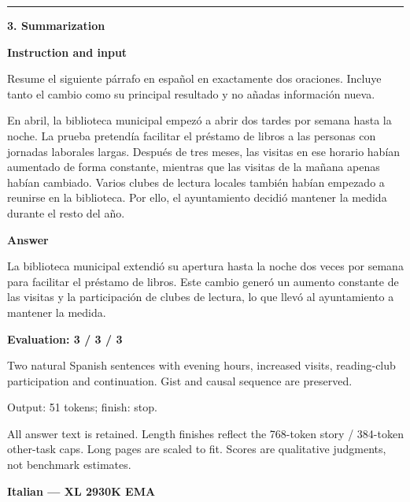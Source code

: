 \documentclass[10pt]{article}
\begin{document}
{\begin{minipage}{\textwidth}
\medskip\hrule\smallskip
{\bfseries 3. Summarization}\par\smallskip
\textbf{Instruction and input}\par Resume el siguiente párrafo en español en exactamente dos oraciones. Incluye tanto el cambio como su principal resultado y no añadas información nueva.
\par\smallskip
En abril, la biblioteca municipal empezó a abrir dos tardes por semana hasta la noche. La prueba pretendía facilitar el préstamo de libros a las personas con jornadas laborales largas. Después de tres meses, las visitas en ese horario habían aumentado de forma constante, mientras que las visitas de la mañana apenas habían cambiado. Varios clubes de lectura locales también habían empezado a reunirse en la biblioteca. Por ello, el ayuntamiento decidió mantener la medida durante el resto del año.\par\smallskip
\textbf{Answer}\par La biblioteca municipal extendió su apertura hasta la noche dos veces por semana para facilitar el préstamo de libros. Este cambio generó un aumento constante de las visitas y la participación de clubes de lectura, lo que llevó al ayuntamiento a mantener la medida.\par\smallskip
\textbf{Evaluation: 3 / 3 / 3}\par Two natural Spanish sentences with evening hours, increased visits, reading-club participation and continuation. Gist and causal sequence are preserved.
\par {\color{gray} Output: 51 tokens; finish: stop.}\par
\medskip\footnotesize All answer text is retained. Length finishes reflect the 768-token story / 384-token other-task caps. Long pages are scaled to fit. Scores are qualitative judgments, not benchmark estimates.
\end{minipage}}%
\noindent\ifdim\dimexpr\ht\languagepage+\dp\languagepage\relax>0.93\textheight%
\resizebox*{!}{0.93\textheight}{\usebox{\languagepage}}%
\else\usebox{\languagepage}\fi%
\clearpage
{\Large\bfseries Italian --- XL 2930K EMA}\par\smallskip
\end{document}
